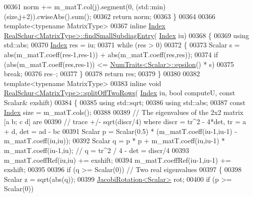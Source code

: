 \begin{DoxyCode}
00361     norm += m\_matT.col(j).segment(0, (std::min)(size,j+2)).cwiseAbs().sum();
00362   \textcolor{keywordflow}{return} norm;
00363 \}
00364 
00366 \textcolor{keyword}{template}<\textcolor{keyword}{typename} MatrixType>
00367 \textcolor{keyword}{inline} \hyperlink{group___eigenvalues___module_a8bd4653e2d9569a44ecc95e746422d3f}{Index} \hyperlink{group___eigenvalues___module_class_eigen_1_1_real_schur}{RealSchur<MatrixType>::findSmallSubdiagEntry}(
      \hyperlink{group___eigenvalues___module_a8bd4653e2d9569a44ecc95e746422d3f}{Index} iu)
00368 \{
00369   \textcolor{keyword}{using} std::abs;
00370   \hyperlink{group___eigenvalues___module_a8bd4653e2d9569a44ecc95e746422d3f}{Index} res = iu;
00371   \textcolor{keywordflow}{while} (res > 0)
00372   \{
00373     Scalar s = abs(m\_matT.coeff(res-1,res-1)) + abs(m\_matT.coeff(res,res));
00374     \textcolor{keywordflow}{if} (abs(m\_matT.coeff(res,res-1)) <= \hyperlink{group___core___module_struct_eigen_1_1_num_traits}{NumTraits<Scalar>::epsilon}() * s)
00375       \textcolor{keywordflow}{break};
00376     res--;
00377   \}
00378   \textcolor{keywordflow}{return} res;
00379 \}
00380 
00382 \textcolor{keyword}{template}<\textcolor{keyword}{typename} MatrixType>
00383 \textcolor{keyword}{inline} \textcolor{keywordtype}{void} \hyperlink{group___eigenvalues___module_class_eigen_1_1_real_schur}{RealSchur<MatrixType>::splitOffTwoRows}(
      \hyperlink{group___eigenvalues___module_a8bd4653e2d9569a44ecc95e746422d3f}{Index} iu, \textcolor{keywordtype}{bool} computeU, \textcolor{keyword}{const} Scalar& exshift)
00384 \{
00385   \textcolor{keyword}{using} std::sqrt;
00386   \textcolor{keyword}{using} std::abs;
00387   \textcolor{keyword}{const} \hyperlink{group___eigenvalues___module_a8bd4653e2d9569a44ecc95e746422d3f}{Index} size = m\_matT.cols();
00388 
00389   \textcolor{comment}{// The eigenvalues of the 2x2 matrix [a b; c d] are }
00390   \textcolor{comment}{// trace +/- sqrt(discr/4) where discr = tr^2 - 4*det, tr = a + d, det = ad - bc}
00391   Scalar p = Scalar(0.5) * (m\_matT.coeff(iu-1,iu-1) - m\_matT.coeff(iu,iu));
00392   Scalar q = p * p + m\_matT.coeff(iu,iu-1) * m\_matT.coeff(iu-1,iu);   \textcolor{comment}{// q = tr^2 / 4 - det = discr/4}
00393   m\_matT.coeffRef(iu,iu) += exshift;
00394   m\_matT.coeffRef(iu-1,iu-1) += exshift;
00395 
00396   \textcolor{keywordflow}{if} (q >= Scalar(0)) \textcolor{comment}{// Two real eigenvalues}
00397   \{
00398     Scalar z = sqrt(abs(q));
00399     \hyperlink{group___jacobi___module_class_eigen_1_1_jacobi_rotation}{JacobiRotation<Scalar>} rot;
00400     \textcolor{keywordflow}{if} (p >= Scalar(0))

\end{DoxyCode}
